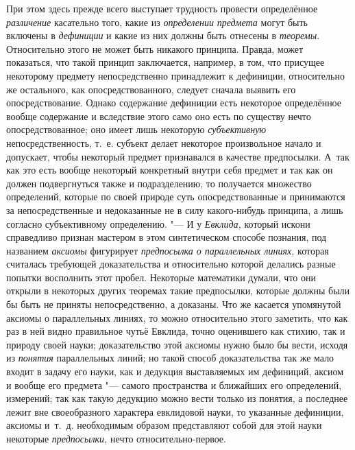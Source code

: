 При этом здесь прежде всего выступает трудность провести
определённое {\em различение}
касательно того, какие из
{\em определении
}{\em предмета} могут
быть включены в {\em дефиниции}
и какие из них должны быть отнесены в
{\em теоремы}.
Относительно этого не может быть никакого принципа. Правда,
может показаться, что такой принцип заключается, например, в том, что
присущее некоторому предмету непосредственно принадлежит к дефиниции,
относительно же остального, как опосредствованного, следует сначала выявить
его опосредствование. Однако содержание дефиниции есть некоторое
определённое вообще содержание и вследствие этого само оно есть по существу
нечто опосредствованное; оно имеет лишь некоторую
{\em субъективную}
непосредственность, т.~е. субъект делает некоторое
произвольное начало и допускает, чтобы некоторый предмет признавался в
качестве предпосылки. А~так как это есть вообще некоторый конкретный внутри
себя предмет и так как он должен подвергнуться также и подразделению, то
получается множество определений, которые по своей природе суть
опосредствованные и принимаются за непосредственные и недоказанные не в
силу какого-нибудь принципа, а лишь согласно субъективному определению. "---
И у {\em Евклида,}
который искони справедливо признан мастером в этом
синтетическом способе познания, под названием
{\em аксиомы} фигурирует
{\em предпосылка о параллельных
линиях,} которая считалась требующей доказательства и
относительно которой делались разные попытки восполнить этот пробел.
Некоторые математики думали, что они открыли в некоторых других теоремах
такие предпосылки, которые должны были бы быть не приняты непосредственно,
а доказаны. Что же касается упомянутой аксиомы о параллельных линиях, то
можно относительно этого заметить, что как раз в ней видно правильное чутьё
Евклида, точно оценившего как стихию, так и природу своей науки;
доказательство этой аксиомы нужно было бы вести, исходя из
{\em понятия}
параллельных линий; но такой способ доказательства так же
мало входит в задачу его науки, как и дедукция выставляемых им дефиниций,
аксиом и вообще его предмета "--- самого пространства и
ближайших его определений, измерений; так как такую дедукцию можно вести
только из понятия, а последнее лежит вне своеобразного характера евклидовой
науки, то указанные дефиниции, аксиомы и~т.~д. необходимым образом
представляют собой для этой науки некоторые
{\em предпосылки,} нечто
относительно-первое.


